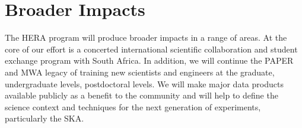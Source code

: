 \documentclass[preprint]{aastex}
\newcommand{\compress}{\vspace{-0.3in}}
\begin{document}


\compress
\section{Broader Impacts} %


The HERA program will produce broader impacts in a range of areas.  At the core of our effort is a concerted international scientific collaboration and student exchange program with South Africa.  In addition, we will continue the PAPER and MWA legacy of training new scientists and engineers at the graduate, undergraduate levels, postdoctoral levels.  We will make major data products available publicly as a benefit to the community and will help to define the science context and techniques for the next generation of experiments, particularly the SKA.
\end{document}
